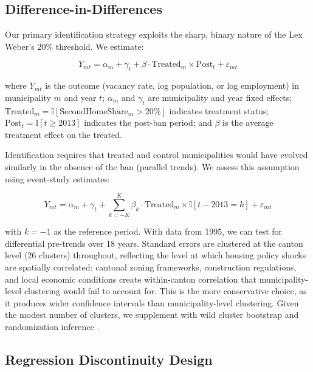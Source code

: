 \documentclass[12pt]{article}
\newcommand{\ind}{\mathbb{I}}
\begin{document}
\subsection{Difference-in-Differences}

Our primary identification strategy exploits the sharp, binary nature of the Lex Weber's 20\% threshold. We estimate:

\begin{equation}
Y_{mt} = \alpha_m + \gamma_t + \beta \cdot \text{Treated}_m \times \text{Post}_t + \varepsilon_{mt}
\label{eq:did}
\end{equation}

\noindent where $Y_{mt}$ is the outcome (vacancy rate, log population, or log employment) in municipality $m$ and year $t$; $\alpha_m$ and $\gamma_t$ are municipality and year fixed effects; $\text{Treated}_m = \ind[\text{SecondHomeShare}_m > 20\%]$ indicates treatment status; $\text{Post}_t = \ind[t \geq 2013]$ indicates the post-ban period; and $\beta$ is the average treatment effect on the treated.

Identification requires that treated and control municipalities would have evolved similarly in the absence of the ban (parallel trends). We assess this assumption using event-study estimates:

\begin{equation}
Y_{mt} = \alpha_m + \gamma_t + \sum_{k=-K}^{K} \beta_k \cdot \text{Treated}_m \times \ind[t - 2013 = k] + \varepsilon_{mt}
\label{eq:eventstudy}
\end{equation}

\noindent with $k = -1$ as the reference period. With data from 1995, we can test for differential pre-trends over 18 years. Standard errors are clustered at the canton level (26 clusters) throughout, reflecting the level at which housing policy shocks are spatially correlated: cantonal zoning frameworks, construction regulations, and local economic conditions create within-canton correlation that municipality-level clustering would fail to account for. This is the more conservative choice, as it produces wider confidence intervals than municipality-level clustering. Given the modest number of clusters, we supplement with wild cluster bootstrap \citep{cameron2008bootstrap} and randomization inference \citep{fisher1935design}.

\subsection{Regression Discontinuity Design}
\end{document}
